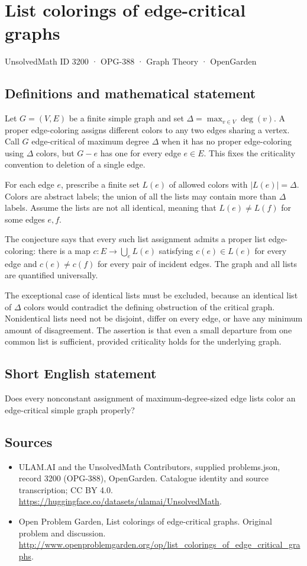 \documentclass[11pt,a4paper]{article}
\begin{document}
\section*{List colorings of edge-critical graphs}\label{3200}
{\small UnsolvedMath ID 3200 · OPG-388 · Graph Theory · OpenGarden}
\subsection{Definitions and mathematical statement}
Let $G=(V,E)$ be a finite simple graph and set $\Delta=\max_{v\in V}\deg(v)$. A proper edge-coloring assigns different colors to any two edges sharing a vertex. Call $G$ edge-critical of maximum degree $\Delta$ when it has no proper edge-coloring using $\Delta$ colors, but $G-e$ has one for every edge $e\in E$. This fixes the criticality convention to deletion of a single edge.

For each edge $e$, prescribe a finite set $L(e)$ of allowed colors with $|L(e)|=\Delta$. Colors are abstract labels; the union of all the lists may contain more than $\Delta$ labels. Assume the lists are not all identical, meaning that $L(e)\ne L(f)$ for some edges $e,f$.

The conjecture says that every such list assignment admits a proper list edge-coloring: there is a map $c:E\to\bigcup_e L(e)$ satisfying $c(e)\in L(e)$ for every edge and $c(e)\ne c(f)$ for every pair of incident edges. The graph and all lists are quantified universally.

The exceptional case of identical lists must be excluded, because an identical list of $\Delta$ colors would contradict the defining obstruction of the critical graph. Nonidentical lists need not be disjoint, differ on every edge, or have any minimum amount of disagreement. The assertion is that even a small departure from one common list is sufficient, provided criticality holds for the underlying graph.
\subsection{Short English statement}
Does every nonconstant assignment of maximum-degree-sized edge lists color an edge-critical simple graph properly?
\subsection{Sources}
\begin{itemize}
\item[S1] ULAM.AI and the UnsolvedMath Contributors, supplied problems.json, record 3200 (OPG-388), OpenGarden. Catalogue identity and source transcription; CC BY 4.0.
\url{https://huggingface.co/datasets/ulamai/UnsolvedMath}.
\item[S2] Open Problem Garden, List colorings of edge-critical graphs. Original problem and discussion.
\url{http://www.openproblemgarden.org/op/list_colorings_of_edge_critical_graphs}.
\end{itemize}
\end{document}

